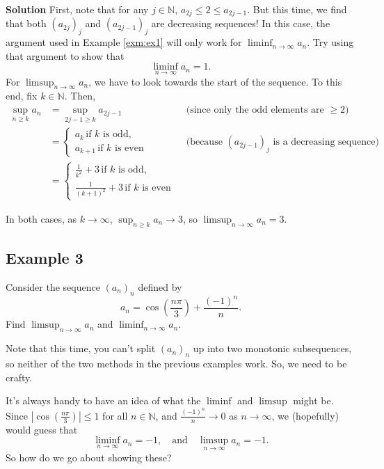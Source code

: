 \documentclass[
  12pt,
  a4paper]{extarticle}
\theoremstyle{plain}
\theoremstyle{definition}
\theoremstyle{plain}
\theoremstyle{plain}
\theoremstyle{plain}
\theoremstyle{plain}
\theoremstyle{definition}
\theoremstyle{definition}
\theoremstyle{remark}
\theoremstyle{remark}
\let\BeginKnitrBlock\begin \let\EndKnitrBlock\end
\renewcommand{\;}{\,}
\begin{document}
\textbf{Solution}
First, note that for any \(j\in\mathbb{N}\), \(a_{2j} \leq 2 \leq a_{2j-1}\). But this time, we find that both \((a_{2j})_j\) and \((a_{2j-1})_j\) are decreasing sequences! In this case, the argument used in Example \ref{exm:ex1} will only work for \(\liminf_{n\to\infty} a_n.\) Try using that argument to show that \[\liminf_{n\to\infty}a_n = 1.\] For \(\limsup_{n\to\infty} a_n\), we have to look towards the start of the sequence. To this end, fix \(k \in \mathbb{N}\). Then,
\begin{align*}
\sup_{n\geq k}a_n &= \sup_{2j-1 \geq k} a_{2j - 1} \; \; &&\text{(since only the odd elements are $\geq 2$)}\\
&=\begin{cases}
a_k \; \text{if $k$ is odd},\\
a_{k+1} \; \text{if $k$ is even}\end{cases} \; \; &&\text{(because $(a_{2j-1})_j$ is a decreasing sequence)}\\
&=\begin{cases}
\frac{1}{k^2} + 3 \; \text{if $k$ is odd},\\
\frac{1}{(k+1)^2} + 3 \; \text{if $k$ is even}\end{cases}
\end{align*}

In both cases, as \(k \to \infty\), \(\sup_{n\geq k }a_n \to 3\), so \(\limsup_{n \to \infty} a_n = 3\).

\hypertarget{example-3}{%
\subsection*{Example 3}\label{example-3}}

\BeginKnitrBlock{example}
{\label{exm:ex3} }Consider the sequence \((a_n)_{n}\) defined by \[a_n = \cos\left(\frac{n\pi}{3}\right) + \frac{(-1)^n}{n}.\] Find \(\limsup_{n \to \infty} a_n\) and \(\liminf_{n \to \infty} a_n\).
\EndKnitrBlock{example}
Note that this time, you can't split \((a_n)_n\) up into two monotonic subsequences, so neither of the two methods in the previous examples work. So, we need to be crafty.

It's always handy to have an idea of what the \(\liminf\) and \(\limsup\) might be. Since \(\left\lvert\cos\left(\frac{n\pi}{3}\right)\right\rvert \leq 1\) for all \(n \in \mathbb{N}\), and \(\frac{(-1)^n}{n} \to 0\) as \(n \to \infty\), we (hopefully) would guess that \[\liminf_{n\to\infty}a_n = -1, \quad \text{and} \quad \limsup_{n \to \infty} a_n = -1.\] So how do we go about showing these?
\end{document}
